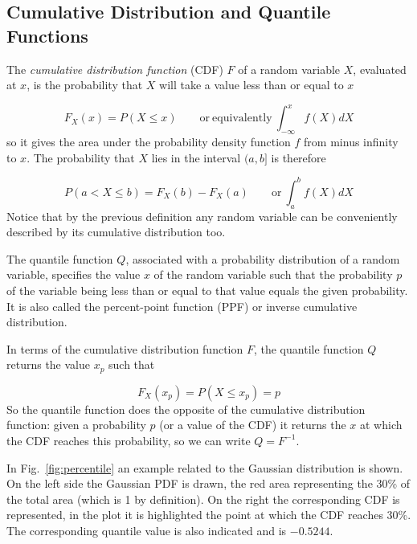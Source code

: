 \subsection{Cumulative Distribution and Quantile Functions}\label{sec:quantile-function}

The \emph{cumulative distribution function} (CDF) \(F\) of a random variable \(X\), 
evaluated at \(x\), is the probability that \(X\) will take a value less than or equal to \(x\)

\begin{equation}
	F_X(x) = P(X \le x)\qquad\mathrm{or~equivalently}~\int_{-\infty}^{x}{f(X)dX}
\end{equation}
so it gives the area under the probability density function \(f\) from
minus infinity to \(x\).
The probability that \(X\) lies in the interval \((a,b]\) is therefore

\begin{equation}
	P(a\lt X \le b)=F_{X}(b)-F_{X}(a)\qquad\mathrm{or}~\int_a^b{f(X)dX}
\end{equation}
Notice that by the previous definition any random variable can be conveniently described by its 
cumulative distribution too.

The quantile function $Q$, associated with a probability distribution of a random variable, specifies the value $x$ of the random variable such that the probability $p$ of the variable being less than or equal to that value equals the given probability. It is also called the percent-point function (PPF) or inverse cumulative distribution.

In terms of the cumulative distribution function \(F\), the quantile function \(Q\) returns the value \(x_p\) such that 

\begin{equation}
F_{X}(x_p)=P(X\le x_p)=p
\end{equation}
So the quantile function does the opposite of the cumulative distribution function: given a probability \(p\) (or a value of the CDF) it returns the \(x\) at which the CDF reaches this probability, so we can write $Q=F^{-1}$.

In Fig.~\ref{fig:percentile} an example related to the Gaussian distribution is shown. On the left side the Gaussian PDF is drawn, the red area representing the 30\% of the total area (which is 1 by definition). On the right the corresponding CDF is represented, in the plot it is highlighted the point at which the CDF reaches 30\%. The corresponding quantile value is also indicated and 
is $-0.5244$.

